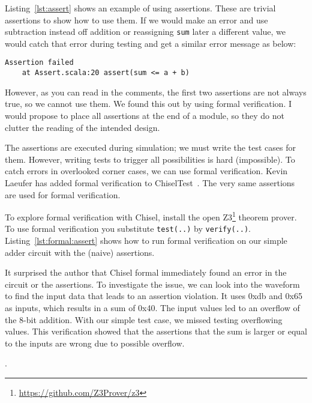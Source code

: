 \documentclass[%
    10pt,
    headinclude, footexclude,
    openright, %
    notitlepage,
    cleardoubleempty,
    headsepline,
    pointlessnumbers,
    bibtotoc, idxtotoc,
    ]{scrbook}
\newcommand{\code}[1]{{\lstinline[basicstyle=\small\ttfamily]{#1}}}
\newcommand{\todo}[1]{{\emph{TODO: #1}}}
\newcommand{\myref}[2]{\href{#1}{#2}}
\renewcommand{\myref}[2]{{#2}{\footnote{\url{#1}}}}
\renewcommand{\todo}[1]{}
\begin{document}
Listing~\ref{lst:assert} shows an example of using assertions. These are trivial assertions
to show how to use them. If we would make an error and use subtraction instead off addition
or reassigning \code{sum} later a different value,
we would catch that error during testing and get a similar error message as below:

\begin{verbatim}
Assertion failed
    at Assert.scala:20 assert(sum <= a + b)
\end{verbatim}

However, as you can read in the comments, the first two assertions
are not always true, so we cannot use them. We found this out by
using formal verification.
I would propose to place all assertions at the end of a module,
so they do not clutter the reading of the intended design.

\todo{Write on overlooking edge cases, just use too small numbers and not
test the overflow.}

The assertions are executed during simulation; we must write the test cases
for them. However, writing tests to trigger all possibilities is hard (impossible).
To catch errors in overlooked corner cases, we can use formal verification.
Kevin Laeufer has added formal verification to ChiselTest~\cite{kevin:formal:woset2021}.
The very same assertions are used for formal verification.

To explore formal verification with Chisel, install
the open \myref{https://github.com/Z3Prover/z3}{Z3} theorem prover.
To use formal verification you substitute \code{test(..)} by \code{verify(..)}.
Listing~\ref{lst:formal:assert} shows how to run formal verification on our
simple adder circuit with the (naive) assertions.

It surprised the author that Chisel formal immediately found an error in the circuit or the assertions.
To investigate the issue, we can look into the waveform to find the input data
that leads to an assertion violation. It uses 0xdb and 0x65 as inputs, which results in
a sum of 0x40. The input values led to an overflow of the 8-bit addition.
With our simple test case, we missed testing overflowing values.
This verification showed that the assertions that the sum is larger or equal to
the inputs are wrong due to possible overflow.


\todo{read on \url{https://github.com/tdb-alcorn/chisel-formal}.
How is this related to Kevin's work?}.
\end{document}
